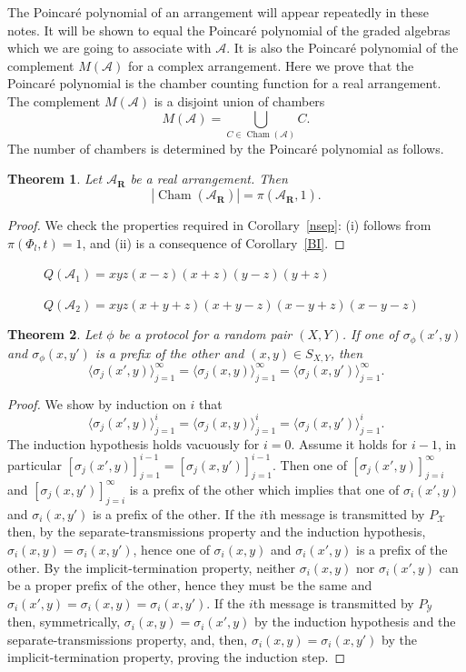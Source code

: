 \documentclass{article}
\newtheorem{thm}{Theorem}[section]
\theoremstyle{definition}
\theoremstyle{remark}
\newcommand{\A}{\mathcal{A}}
\newcommand{\st}{\sigma}
\newcommand{\XcY}{{(X,Y)}}
\newcommand{\SXY}{{S_{X,Y}}}
\newcommand{\PY}{{P_{\mathcal{Y}}}}
\newcommand{\X}{{\mathcal{X}}}
\DeclareMathOperator{\Cham}{Cham}
\newcommand{\envert}[1]{\left\lvert#1\right\rvert}
\let\abs=\envert
\begin{document}
The Poincar\'e polynomial of an arrangement
will appear repeatedly
in these notes. It will be shown to equal the
Poincar\'e polynomial
of the graded algebras which we are going to
associate with $\A$. It is also the Poincar\'e
polynomial of the complement $M(\A)$ for a
complex arrangement. Here we prove
that the Poincar\'e polynomial is the chamber
counting function for a real arrangement. The
complement $M(\A)$ is a disjoint union of chambers
\[M(\A) = \bigcup_{C \in \Cham(\A)} C.\]
The number
of chambers is determined by the Poincar\'e
polynomial as follows.

\begin{thm}\label{th-realarr}
Let $\A_{\mathbf{R}}$ be a real arrangement. Then
\[ \abs{\Cham(\A_{\mathbf{R}})} = \pi (\A_{\mathbf{R}},1). \]
\end{thm}

\begin{proof}
We check the properties required in Corollary~\ref{nsep}:
(i) follows from $\pi (\Phi_{ l},t) = 1$, and (ii) is a
consequence of Corollary~\ref{BI}.
\end{proof}

\begin{figure}
\vspace{5cm}
\caption[]{$Q(\A_{1}) = xyz(x-z)(x+z)(y-z)(y+z)$}
\end{figure}

\begin{figure}
\vspace{5cm}
\caption[]{$Q(\A_{2})= xyz(x+y+z)(x+y-z)(x-y+z)(x-y-z)$}
\end{figure}


\begin{thm}
\label{T_first_the_int}
Let $\phi$ be a protocol for a random pair $\XcY$.
If one of $\st_\phi(x',y)$ and $\st_\phi(x,y')$ is a prefix of the other
and $(x,y)\in\SXY$, then
\[
\langle \st_j(x',y)\rangle_{j=1}^\infty
=\langle \st_j(x,y)\rangle_{j=1}^\infty
=\langle \st_j(x,y')\rangle_{j=1}^\infty .
\]
\end{thm}
\begin{proof}
We show by induction on $i$ that
\[
\langle \st_j(x',y)\rangle_{j=1}^i
=\langle \st_j(x,y)\rangle_{j=1}^i
=\langle \st_j(x,y')\rangle_{j=1}^i.
\]
The induction hypothesis holds vacuously for $i=0$. Assume it holds for
$i-1$, in particular
$[\st_j(x',y)]_{j=1}^{i-1}=[\st_j(x,y')]_{j=1}^{i-1}$. Then one of
$[\st_j(x',y)]_{j=i}^{\infty}$ and $[\st_j(x,y')]_{j=i}^{\infty}$ is a
prefix of the other which implies that one of $\st_i(x',y)$ and
$\st_i(x,y')$ is a prefix of the other. If the $i$th message is
transmitted by $P_\X$ then, by the separate-transmissions property and
the induction hypothesis, $\st_i(x,y)=\st_i(x,y')$, hence one of
$\st_i(x,y)$ and $\st_i(x',y)$ is a prefix of the other. By the
implicit-termination property, neither $\st_i(x,y)$ nor $\st_i(x',y)$
can be a proper prefix of the other, hence they must be the same and
$\st_i(x',y)=\st_i(x,y)=\st_i(x,y')$. If the $i$th message is
transmitted by $\PY$ then, symmetrically, $\st_i(x,y)=\st_i(x',y)$ by
the induction hypothesis and the separate-transmissions property, and,
then, $\st_i(x,y)=\st_i(x,y')$ by the implicit-termination property,
proving the induction step.
\end{proof}
\end{document}
